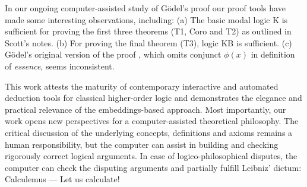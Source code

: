 \documentclass{llncs}
\begin{document}
In our ongoing computer-assisted study of G\"odel's proof our proof
tools have made
some interesting observations, including:
(a) The basic modal logic K is sufficient for proving the first three
theorems (T1, Coro and T2) as outlined in Scott's notes.
(b)  For proving the final theorem (T3), logic KB is
  sufficient.
(c) G\"odel's original  version of the proof \cite{GoedelNotes}, which omits
conjunct $\phi(x)$ in definition of \emph{essence}, seems inconsistent.

This work attests the maturity of contemporary interactive and
automated deduction tools for classical higher-order logic and
demonstrates the elegance and practical relevance of the
embeddings-based approach.  Most importantly, our work opens new
perspectives for a computer-assisted theoretical philosophy.  The
critical discussion of the underlying concepts, definitions and axioms
remains a human responsibility, but the computer can assist in
building and checking rigorously correct logical arguments. In case of
logico-philosophical disputes, the computer can check the disputing
arguments and partially fulfill Leibniz' dictum: Calculemus --- Let us
calculate!

\small
\end{document}
